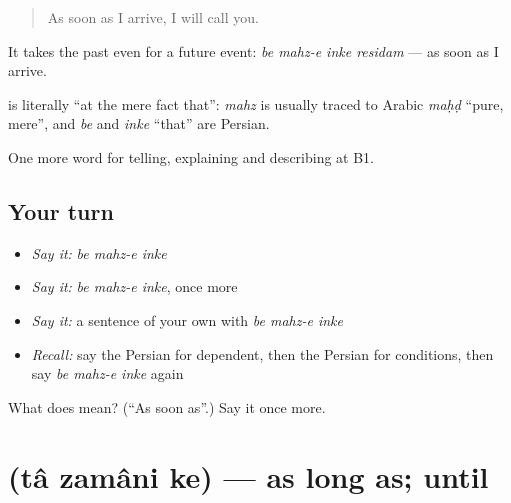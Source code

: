 \begin{quote}
As soon as I arrive, I will call you.
\end{quote}

It takes the past even for a future event: \emph{be mahz-e inke residam} — as soon as I arrive.

\begin{cousinweb}
\textbf{  } is literally \textquotedblleft{}at the mere fact that\textquotedblright{}: \emph{mahz} is usually traced to Arabic \emph{maḥḍ} \textquotedblleft{}pure, mere\textquotedblright{}, and \emph{be} and \emph{inke} \textquotedblleft{}that\textquotedblright{} are Persian.
\end{cousinweb}

\begin{grammarlens}[title={What you've built}]
One more word for telling, explaining and describing at B1.
\end{grammarlens}

\subsection*{Your turn}
\begin{itemize}
\raggedright
  \item \emph{Say it:} \emph{be mahz-e inke}
  \item \emph{Say it:} \emph{be mahz-e inke}, once more
  \item \emph{Say it:} a sentence of your own with \emph{be mahz-e inke}
  \item \emph{Recall:} say the Persian for dependent, then the Persian for conditions, then say \emph{be mahz-e inke} again
\end{itemize}

\begin{tcolorbox}[breakable,colback=teal!4,colframe=teal!35!black,title={Before you move on}]
What does    mean? (\textquotedblleft{}As soon as\textquotedblright{}.) Say it once more.
\end{tcolorbox}
\section[\texorpdfstring{\fa{تا} \fa{زمانی} \fa{که} (tâ zamâni ke)}{تا زمانی که (tâ zamâni ke)}]{   (tâ zamâni ke) — as long as; until}

\label{lesson:FA-C395-ta-zamani-ke}



